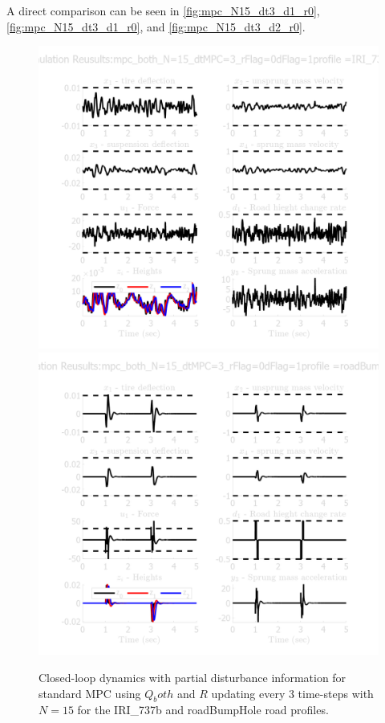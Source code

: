 \documentclass[]{IEEEtran}
\begin{document}
A direct comparison can be seen in \autoref{fig:mpc_N15_dt3_d1_r0},\autoref{fig:mpc_N15_dt3_d1_r0}, and \autoref{fig:mpc_N15_dt3_d2_r0}. 

\begin{figure}[h]
    \centering
    \includegraphics[width = 0.49 \columnwidth]{figs/results_mpc_both_N=15_dtMPC=3_rFlag=0_dFlag=1_IRI_737b.png}
    \includegraphics[width = 0.49 \columnwidth]{figs/results_mpc_both_N=15_dtMPC=3_rFlag=0_dFlag=1_roadBumpHole.png}
    \caption{Closed-loop dynamics with partial disturbance information for standard MPC using $Q_both$ and $R$ updating every 3 time-steps with $N=15$ for the IRI\_737b and roadBumpHole road profiles.} \label{fig:mpc_N15_dt3_d1_r0}
\end{figure}
\end{document}
